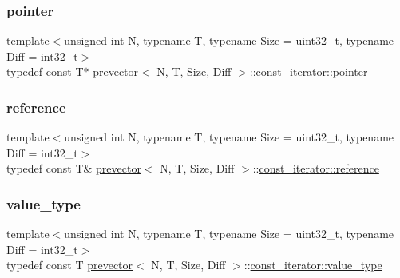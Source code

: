 \mbox{\label{classprevector_1_1const__iterator_a66b8b55134c8336e8beccf4669c6a32c}} 
\subsubsection{\texorpdfstring{pointer}{pointer}}
{\footnotesize\ttfamily template$<$unsigned int N, typename T, typename Size = uint32\+\_\+t, typename Diff = int32\+\_\+t$>$ \\
typedef const T$\ast$ \mbox{\hyperlink{classprevector}{prevector}}$<$ N, T, Size, Diff $>$\+::\mbox{\hyperlink{classprevector_1_1const__iterator_a66b8b55134c8336e8beccf4669c6a32c}{const\+\_\+iterator\+::pointer}}}

\mbox{\label{classprevector_1_1const__iterator_a0e0ec121eb938f268419ab5945fcda33}} 
\subsubsection{\texorpdfstring{reference}{reference}}
{\footnotesize\ttfamily template$<$unsigned int N, typename T, typename Size = uint32\+\_\+t, typename Diff = int32\+\_\+t$>$ \\
typedef const T\& \mbox{\hyperlink{classprevector}{prevector}}$<$ N, T, Size, Diff $>$\+::\mbox{\hyperlink{classprevector_1_1const__iterator_a0e0ec121eb938f268419ab5945fcda33}{const\+\_\+iterator\+::reference}}}

\mbox{\label{classprevector_1_1const__iterator_a5eb2ebba5993718446f0439d79b7157d}} 
\subsubsection{\texorpdfstring{value\+\_\+type}{value\_type}}
{\footnotesize\ttfamily template$<$unsigned int N, typename T, typename Size = uint32\+\_\+t, typename Diff = int32\+\_\+t$>$ \\
typedef const T \mbox{\hyperlink{classprevector}{prevector}}$<$ N, T, Size, Diff $>$\+::\mbox{\hyperlink{classprevector_1_1const__iterator_a5eb2ebba5993718446f0439d79b7157d}{const\+\_\+iterator\+::value\+\_\+type}}}



